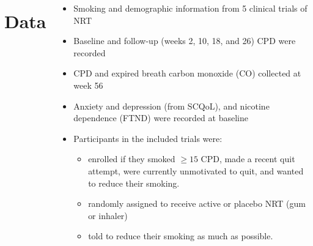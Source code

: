 \documentclass[
	25pt,
	a0paper, 
	portrait,
	blockverticalspace=-3em,
	margin=.5in,
	innermargin=0mm
]{tikzposter}
\begin{document}
	{

		\begin{columns}
				\begin{minipage}[]{0.31\linewidth}
					\large
					\section*{Data}
	
					\begin{itemize}
						\raggedright
						\item Smoking and demographic information from 5 clinical trials of NRT	\cite{wennikeSmokingReductionPromotes2003,rennardEfficacyNicotineInhaler2006,bolligerSmokingReductionOral2000,batraSmokingReductionTreatment2005,hausteinDoubleblindRandomizedPlacebocontrolled2001}					
						\item Baseline and follow-up (weeks 2, 10, 18, and 26) CPD were recorded
						\item CPD and expired breath carbon monoxide (CO) collected at week 56
						\item Anxiety and depression (from SCQoL\cite{OlufadeEtAl1999}), and nicotine dependence (FTND\cite{fagerstromNicotineAddictionIts1990}) were recorded at baseline
						\item Participants in the included trials were:
							\begin{itemize}
									\item enrolled if they smoked $\geq 15$ CPD, made a recent quit attempt, were currently unmotivated to quit, and wanted to reduce their smoking.
									\item randomly assigned to receive active or placebo NRT (gum or inhaler)
									\item told to reduce their smoking as much as possible.
								\end{itemize}
					\end{itemize}
				\end{minipage}
				\begin{minipage}[]{0.375\linewidth}
				

\end{minipage}
\end{columns}}
\end{document}
